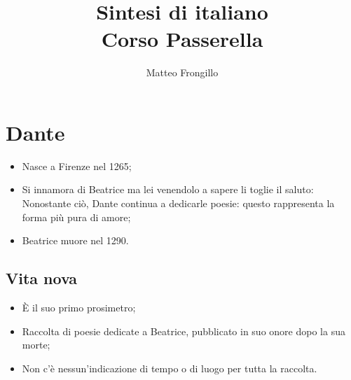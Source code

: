 \documentclass{article}
\title{\textbf{Sintesi di italiano\\Corso Passerella}}
\author{Matteo Frongillo}
\begin{document}
\maketitle
\tableofcontents
\newpage

\section{Dante}
\begin{itemize}
    \item Nasce a Firenze nel 1265;
    \item Si innamora di Beatrice ma lei venendolo a sapere li toglie il saluto:\\
        Nonostante ciò, Dante continua a dedicarle poesie: questo rappresenta la forma più
        pura di amore;
    \item Beatrice muore nel 1290.
\end{itemize}

\subsection{Vita nova}
\begin{itemize}
    \item È il suo primo prosimetro;
    \item Raccolta di poesie dedicate a Beatrice, pubblicato in suo onore dopo la sua morte;
    \item Non c'è nessun'indicazione di tempo o di luogo per tutta la raccolta.
\end{itemize}
\end{document}
